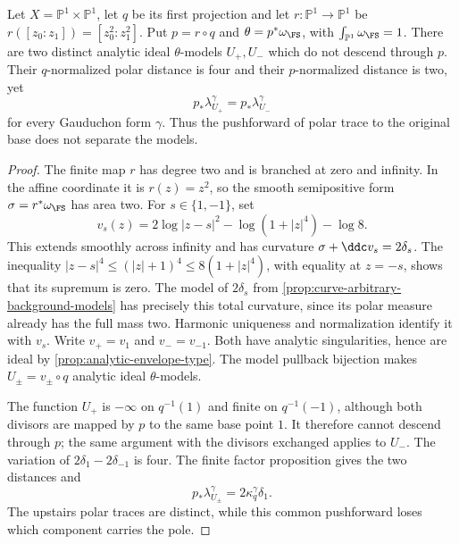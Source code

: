 \begin{example}\label{curve-backgrounds647:disconnected-fibers}
Let $X=\mathbb P^1\times\mathbb P^1$, let $q$ be its first
projection and let $r:\mathbb P^1\to\mathbb P^1$ be
$r([z_0:z_1])=[z_0^2:z_1^2]$. Put $p=r\circ q$ and
$\theta=p^*\omega_{\FS}$, with $\int_{\mathbb P^1}\omega_{\FS}=1$.
There are two distinct analytic ideal $\theta$-models $U_+,U_-$
which do not descend through $p$. Their $q$-normalized polar
distance is four and their $p$-normalized distance is two, yet
\[
 p_*\lambda_{U_+}^\gamma=p_*\lambda_{U_-}^\gamma
\]
for every Gauduchon form $\gamma$. Thus the pushforward of polar
trace to the original base does not separate the models.
\end{example}
\begin{proof}
The finite map $r$ has degree two and is branched at zero and
infinity. In the affine coordinate it is $r(z)=z^2$, so the
smooth semipositive form $\sigma=r^*\omega_{\FS}$ has area two.
For $s\in\{1,-1\}$, set
\[
 v_s(z)=2\log|z-s|^2-\log(1+|z|^4)-\log8.
\]
This extends smoothly across infinity and has curvature
$\sigma+\ddc v_s=2\delta_s$. The inequality
$|z-s|^4\leq(|z|+1)^4\leq8(1+|z|^4)$, with equality at
$z=-s$, shows that its supremum is zero.
The model of $2\delta_s$ from
\cref{prop:curve-arbitrary-background-models} has precisely
this total curvature, since its polar measure already has the
full mass two. Harmonic uniqueness and normalization identify
it with $v_s$. Write $v_+=v_1$ and $v_-=v_{-1}$. Both have
analytic singularities, hence are ideal by
\cref{prop:analytic-envelope-type}. The model pullback bijection makes
$U_\pm=v_\pm\circ q$ analytic ideal $\theta$-models.

The function $U_+$ is $-\infty$ on $q^{-1}(1)$ and finite on
$q^{-1}(-1)$, although both divisors are mapped by $p$ to the
same base point $1$. It therefore cannot descend through $p$;
the same argument with the divisors exchanged applies to $U_-$.
The variation of $2\delta_1-2\delta_{-1}$ is four. The finite
factor proposition gives the two distances and
\[
 p_*\lambda_{U_\pm}^\gamma
   =2\kappa_q^\gamma\delta_1.
\]
The upstairs polar traces are distinct, while this common
pushforward loses which component carries the pole.
\end{proof}
